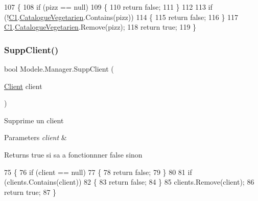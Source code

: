 \begin{DoxyCode}
107         \{
108             \textcolor{keywordflow}{if} (pizz == null)
109             \{
110                 \textcolor{keywordflow}{return} \textcolor{keyword}{false};
111             \}
112 
113             \textcolor{keywordflow}{if} (!\hyperlink{classModele_1_1Manager_a54bbc7bd646fcaa0f1a590310dd3c02c}{C1}.\hyperlink{classModele_1_1Catalogue_abd7d6d70ddd6ba264c1c91a5b084d9ba}{CatalogueVegetarien}.Contains(pizz))
114             \{
115                 \textcolor{keywordflow}{return} \textcolor{keyword}{false};
116             \}
117             \hyperlink{classModele_1_1Manager_a54bbc7bd646fcaa0f1a590310dd3c02c}{C1}.\hyperlink{classModele_1_1Catalogue_abd7d6d70ddd6ba264c1c91a5b084d9ba}{CatalogueVegetarien}.Remove(pizz);
118             \textcolor{keywordflow}{return} \textcolor{keyword}{true};
119         \}
\end{DoxyCode}
\mbox{\label{classModele_1_1Manager_a27aa5c5077667211da410d55fd6c17b9}} 
\subsubsection{\texorpdfstring{Supp\+Client()}{SuppClient()}}
{\footnotesize\ttfamily bool Modele.\+Manager.\+Supp\+Client (\begin{DoxyParamCaption}\item[{\hyperlink{classModele_1_1Client}{Client}}]{client }\end{DoxyParamCaption})\hspace{0.3cm}{\ttfamily [inline]}}



Supprime un client 


\begin{DoxyParams}{Parameters}
{\em client} & \\
\hline
\end{DoxyParams}
\begin{DoxyReturn}{Returns}
true si sa a fonctionnner false sinon
\end{DoxyReturn}

\begin{DoxyCode}
75         \{
76             \textcolor{keywordflow}{if} (client == null)
77             \{
78                 \textcolor{keywordflow}{return} \textcolor{keyword}{false};
79             \}
80 
81             \textcolor{keywordflow}{if} (clients.Contains(client))
82             \{
83                 \textcolor{keywordflow}{return} \textcolor{keyword}{false};
84             \}
85             clients.Remove(client);
86             \textcolor{keywordflow}{return} \textcolor{keyword}{true};
87         \}
\end{DoxyCode}
\mbox{\label{classModele_1_1Manager_ae68e67c9a17910118dd74fa2230383b0}} 
